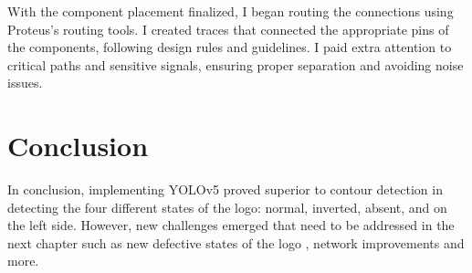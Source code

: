 With the component placement finalized, I began routing the connections using Proteus's routing tools. I created traces that connected the appropriate pins of the components, following design rules and guidelines. I paid extra attention to critical paths and sensitive signals, ensuring proper separation and avoiding noise issues.

\section{Conclusion}
In conclusion, implementing YOLOv5 proved superior to contour detection in detecting the four different states of the logo: normal, inverted, absent, and on the left side. However, new challenges emerged that need to be addressed in the next chapter such as new defective states of the logo , network improvements and more.
%




%